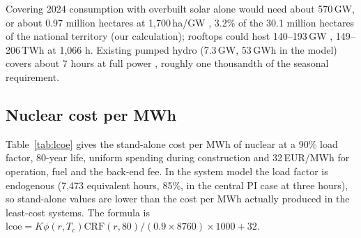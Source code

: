 Covering 2024 consumption with overbuilt solar alone would need about 570\,GW, or about 0.97 million hectares at 1{,}700\,ha/GW \citep{ISPRA2026}, 3.2\% of the 30.1 million hectares of the national territory (our calculation); rooftops could host 140--193\,GW \citep{ISPRA2026}, 149--206\,TWh at 1{,}066 h. Existing pumped hydro (7.3\,GW, 53\,GWh in the model) covers about 7 hours at full power \citep{Pumped2025}, roughly one thousandth of the seasonal requirement.

\subsection{Nuclear cost per MWh}\label{app:nuclear}
Table~\ref{tab:lcoe} gives the stand-alone cost per MWh of nuclear at a 90\% load factor, 80-year life, uniform spending during construction and 32\,EUR/MWh for operation, fuel and the back-end fee. In the system model the load factor is endogenous (7{,}473 equivalent hours, 85\%, in the central PI case at three hours), so stand-alone values are lower than the cost per MWh actually produced in the least-cost systems. The formula is $\mathrm{lcoe}=K\phi(r,T_c)\mathrm{CRF}(r,80)/(0.9\times8760)\times1000+32$.

\begin{table}[htbp]
\centering\small
\caption{Stand-alone nuclear cost (EUR/MWh) of the five cases at 90\% load factor, 5\% and 7\%.}\label{tab:lcoe}

\end{table}

